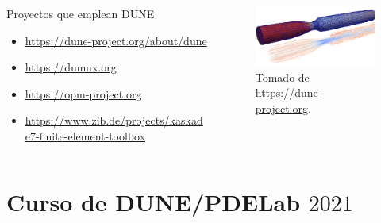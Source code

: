 \begin{frame}
	\frametitle{\secname}
	\framesubtitle{\subsecname}

	\begin{columns}
		\begin{column}{0.5\textwidth}
			\begin{alertblock}{Proyectos que emplean DUNE}
				\begin{itemize}
					\item \url{https://dune-project.org/about/dune}
					\item \url{https://dumux.org}
					\item \url{https://opm-project.org}
					\item \url{https://www.zib.de/projects/kaskade7-finite-element-toolbox}
				\end{itemize}
			\end{alertblock}
		\end{column}

		\begin{column}{0.5\textwidth}
			\begin{figure}[ht!]
				\centering
				\includegraphics[width=7.5cm]{blood_girke}
				\caption{Tomado de \url{https://dune-project.org}.}
			\end{figure}
		\end{column}
	\end{columns}
\end{frame}

\section{Curso de DUNE/PDELab $2021$}

